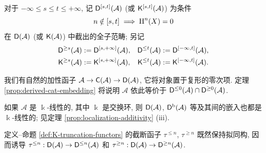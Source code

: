 \begin{definition}
	对于 $-\infty \leq s \leq t \leq +\infty$, 记 $\mathsf{D}^{[s,t]}(\mathcal{A})$ (或 $\mathsf{K}^{[s, t]}(\mathcal{A})$) 为条件
	\[ n \notin [s, t] \implies \operatorname{H}^n(X) = 0 \]
	在 $\mathsf{D}(\mathcal{A})$ (或 $\mathsf{K}(\mathcal{A})$) 中截出的全子范畴; 另记
	\begin{align*}
		\mathsf{D}^{\geq s}(\mathcal{A}) & := \mathsf{D}^{[s, +\infty]}(\mathcal{A}), &
		\mathsf{D}^{\leq t}(\mathcal{A}) & := \mathsf{D}^{[-\infty, t]}(\mathcal{A}), \\
		\mathsf{K}^{\geq s}(\mathcal{A}) & := \mathsf{K}^{[s, +\infty]}(\mathcal{A}), &
		\mathsf{K}^{\leq t}(\mathcal{A}) & := \mathsf{K}^{[-\infty, t]}(\mathcal{A}).
	\end{align*}
\end{definition}

我们有自然的加性函子 $\mathcal{A} \to \mathsf{C}(\mathcal{A}) \to \mathsf{D}(\mathcal{A})$, 它将对象置于复形的零次项. 定理 \ref{prop:derived-cat-embedding} 将说明 $\mathcal{A}$ 依此等价于 $\mathsf{D}^{\leq 0}(\mathcal{A}) \cap \mathsf{D}^{\geq 0}(\mathcal{A})$.

\begin{remark}
	如果 $\mathcal{A}$ 是 $\Bbbk$-线性的, 其中 $\Bbbk$ 是交换环, 则 $\mathsf{D}(\mathcal{A})$, $\mathsf{D}^{\mathrm{b}}(\mathcal{A})$ 等及其间的嵌入也都是 $\Bbbk$-线性的; 见定理 \ref{prop:localization-additivity} (iii).
\end{remark}

定义--命题 \ref{def:K-truncation-functors} 的截断函子 $\tau^{\leq n}$, $\tau^{\geq n}$ 既然保持拟同构, 因而诱导 $\tau^{\leq n}: \mathsf{D}(\mathcal{A}) \to \mathsf{D}^{\leq n}(\mathcal{A})$ 和 $\tau^{\geq n}: \mathsf{D}(\mathcal{A}) \to \mathsf{D}^{\geq n}(\mathcal{A})$.

